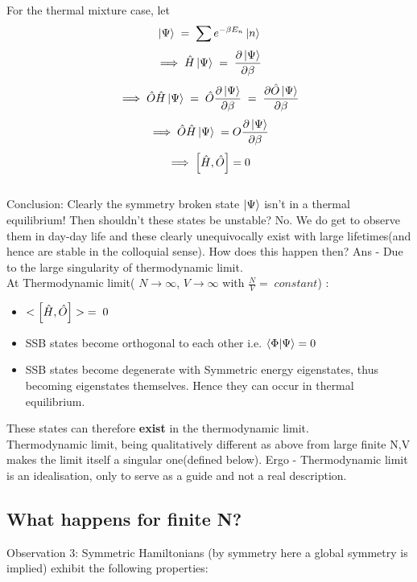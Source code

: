 \documentclass[12pt]{article}
\begin{document}
For the thermal mixture case, let
$$\ket{\Psi}\;=\;\sum e^{-\beta E_n }\ket{n}$$
$$\implies \hat{H}\ket{\Psi}\;=\;\pdv{\ket{\Psi}}{\beta}$$
$$\implies \hat{O}\hat{H}\ket{\Psi}\;=\; \hat{O}\pdv{\ket{\Psi}}{\beta}\;=\;\pdv{\hat{O}\ket{\Psi}}{\beta}$$
$$\implies \hat{O}\hat{H}\ket{\Psi}\;= O \pdv{\ket{\Psi}}{\beta} $$
$$\implies \comm{\hat{H}}{\hat{O}}=0$$
\\
Conclusion: Clearly the symmetry broken state $\ket{\Psi}$ isn't in a thermal equilibrium! Then shouldn't these states be unstable?
No. We do get to observe them in day-day life and these clearly unequivocally exist with large lifetimes(and hence are stable in the colloquial sense).
How does this happen then? Ans - Due to the large singularity of thermodynamic limit. \\
At Thermodynamic limit( $N\rightarrow \infty$, $V\rightarrow \infty$ with $\displaystyle{\frac{N}{V}=\; constant}$) :
\begin{itemize}
    \item  $<\comm{\hat{H}}{\hat{O}}>\;=\;0$
    \item SSB states become orthogonal to each other i.e. $\braket{\Phi}{\Psi}=0$
    \item SSB states become degenerate with Symmetric energy eigenstates, thus becoming eigenstates themselves. Hence they can occur in thermal equilibrium.
\end{itemize}
These states can therefore \textbf{exist} in the thermodynamic limit.\\
Thermodynamic limit, being qualitatively different as above from large finite N,V makes the limit itself a singular one(defined below). Ergo - Thermodynamic limit is an idealisation, only to serve as a guide and not a real description.
\subsection{What happens for finite N?}
Observation 3: Symmetric Hamiltonians (by symmetry here a global symmetry is implied) exhibit the following properties:
\end{document}
